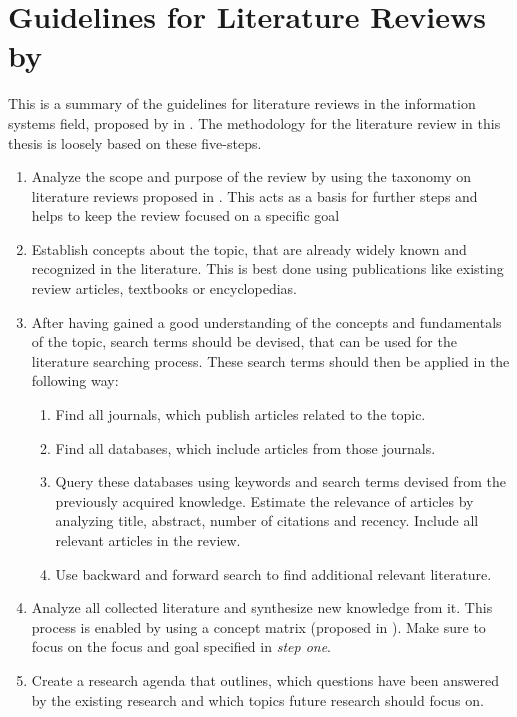 \section{Guidelines for Literature Reviews by \citeauthor*{Brocke2009}}
\label{sec:appendix_brocke}

This is a summary of the guidelines for literature reviews in the information systems field,
proposed by \citeauthor*{Brocke2009} in \cite{Brocke2009}.
The methodology for the literature review in this thesis is loosely based on these five-steps.

\begin{enumerate}
      \item Analyze the scope and purpose of the review by using the taxonomy on
            literature reviews proposed in \cite{Cooper1988}. This acts as a basis for further
            steps and helps to keep the review focused on a specific goal
      \item Establish concepts about the topic, that are already widely known
            and recognized in the literature. This is best done using publications like existing review articles,
            textbooks or encyclopedias.
      \item After having gained a good understanding of the concepts and fundamentals of the topic,
            search terms should be devised, that can be used for the literature searching process.
            These search terms should then be applied in the following way:
            \begin{enumerate}
                  \item Find all journals, which publish articles related to the topic.
                  \item Find all databases, which include articles from those journals.
                  \item Query these databases using keywords and search terms devised from the previously
                        acquired knowledge.
                        Estimate the relevance of articles by analyzing title, abstract, number of citations and recency.
                        Include all relevant articles in the review.
                  \item Use backward and forward search to find additional relevant literature.
            \end{enumerate}
      \item Analyze all collected literature and synthesize new knowledge from it.
            This process is enabled by using a concept matrix (proposed in \cite{Webster2002}).
            Make sure to focus on the focus and goal specified in \emph{step one}.
      \item Create a research agenda that outlines, which questions have been answered by the
            existing research and which topics future research should focus on.
\end{enumerate}

